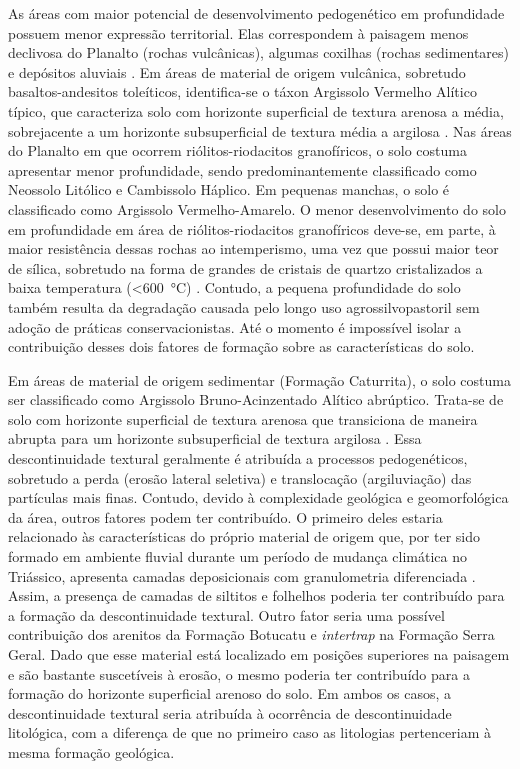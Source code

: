 As áreas com maior potencial de desenvolvimento pedogenético em profundidade possuem menor expressão 
territorial. Elas correspondem à paisagem menos declivosa do Planalto (rochas vulcânicas), algumas coxilhas 
(rochas sedimentares) e depósitos aluviais \cite{Miguel2010}. Em áreas de material de origem vulcânica, 
sobretudo basaltos-andesitos toleíticos, identifica-se o táxon Argissolo Vermelho Alítico típico, que 
caracteriza solo com horizonte superficial de textura arenosa a média, sobrejacente a um horizonte 
subsuperficial de textura média a argilosa \cite{Miguel2010}. Nas áreas do Planalto em que ocorrem 
riólitos-riodacitos granofíricos, o solo costuma apresentar menor profundidade, sendo predominantemente 
classificado como Neossolo Litólico e Cambissolo Háplico. Em pequenas manchas, o solo é classificado como 
Argissolo Vermelho-Amarelo. O menor desenvolvimento do solo em profundidade em área de riólitos-riodacitos 
granofíricos deve-se, em parte, à maior resistência dessas rochas ao intemperismo, uma vez que possui maior 
teor de sílica, sobretudo na forma de grandes de cristais de quartzo cristalizados a baixa temperatura 
(\SI{<600}{\celsius}) \cite{Pedron2007}. Contudo, a pequena profundidade do solo também resulta da degradação 
causada pelo longo uso agrossilvopastoril sem adoção de práticas conservacionistas. Até o momento é impossível 
isolar a contribuição desses dois fatores de formação sobre as características do solo.

Em áreas de material de origem sedimentar (Formação Caturrita), o solo costuma ser classificado como 
Argissolo Bruno-Acinzentado Alítico abrúptico. Trata-se de solo com horizonte superficial de textura arenosa 
que transiciona de maneira abrupta para um horizonte subsuperficial de textura argilosa \cite{Miguel2010}. 
Essa descontinuidade textural geralmente é atribuída a processos pedogenéticos, sobretudo a perda (erosão 
lateral seletiva) e translocação (argiluviação) das partículas mais finas. Contudo, devido à complexidade 
geológica e geomorfológica da área, outros fatores podem ter contribuído. O primeiro deles estaria relacionado 
às características do próprio material de origem que, por ter sido formado em ambiente fluvial durante um 
período de mudança climática no Triássico, apresenta camadas deposicionais com granulometria diferenciada 
\cite{PieriniEtAl2002}. Assim, a presença de camadas de siltitos e folhelhos poderia ter contribuído para a 
formação da descontinuidade textural. Outro fator seria uma possível contribuição dos arenitos da Formação 
Botucatu e \emph{intertrap} na Formação Serra Geral. Dado que esse material está localizado em posições 
superiores na paisagem e são bastante suscetíveis à erosão, o mesmo poderia ter contribuído para a formação do 
horizonte superficial arenoso do solo. Em ambos os casos, a descontinuidade textural seria atribuída à 
ocorrência de descontinuidade litológica, com a diferença de que no primeiro caso as litologias pertenceriam à 
mesma formação geológica.

